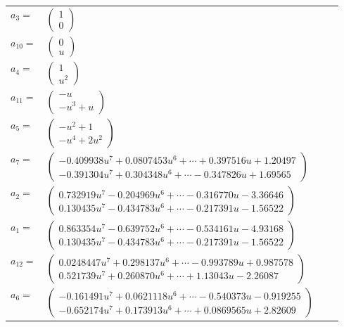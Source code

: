 \documentclass[1p]{elsarticle_modified}
\theoremstyle{definition}
\begin{document}
\begin{tabular}{m{7pt} m{180pt} m{7pt} m{180pt} }
\flushright $a_{3}=$&$\begin{pmatrix}1\\0\end{pmatrix}$ \\
\flushright $a_{10}=$&$\begin{pmatrix}0\\u\end{pmatrix}$ \\
\flushright $a_{4}=$&$\begin{pmatrix}1\\u^2\end{pmatrix}$ \\
\flushright $a_{11}=$&$\begin{pmatrix}- u\\- u^3+u\end{pmatrix}$ \\
\flushright $a_{5}=$&$\begin{pmatrix}- u^2+1\\- u^4+2 u^2\end{pmatrix}$ \\
\flushright $a_{7}=$&$\begin{pmatrix}-0.409938 u^{7}+0.0807453 u^{6}+\cdots+0.397516 u+1.20497\\-0.391304 u^{7}+0.304348 u^{6}+\cdots-0.347826 u+1.69565\end{pmatrix}$ \\
\flushright $a_{2}=$&$\begin{pmatrix}0.732919 u^{7}-0.204969 u^{6}+\cdots-0.316770 u-3.36646\\0.130435 u^{7}-0.434783 u^{6}+\cdots-0.217391 u-1.56522\end{pmatrix}$ \\
\flushright $a_{1}=$&$\begin{pmatrix}0.863354 u^{7}-0.639752 u^{6}+\cdots-0.534161 u-4.93168\\0.130435 u^{7}-0.434783 u^{6}+\cdots-0.217391 u-1.56522\end{pmatrix}$ \\
\flushright $a_{12}=$&$\begin{pmatrix}0.0248447 u^{7}+0.298137 u^{6}+\cdots-0.993789 u+0.987578\\0.521739 u^{7}+0.260870 u^{6}+\cdots+1.13043 u-2.26087\end{pmatrix}$ \\
\flushright $a_{6}=$&$\begin{pmatrix}-0.161491 u^{7}+0.0621118 u^{6}+\cdots-0.540373 u-0.919255\\-0.652174 u^{7}+0.173913 u^{6}+\cdots+0.0869565 u+2.82609\end{pmatrix}$ \\

\end{tabular}
\end{document}
